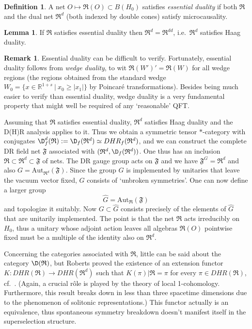 \documentclass[11pt]{article}
\newcommand{\alg}[1]{\mathfrak{#1}}
\theoremstyle{definition}
\newtheorem{lemma}[thm]{Lemma}
\theoremstyle{definition}
\newtheorem{defn}[thm]{Definition}
\newtheorem{note}[thm]{Remark}
\theoremstyle{remark}
\def\7#1{{\mathbb #1}}
\def\al#1{{\mathfrak #1}}
\newcommand{\Aut}{\mathrm{Aut}}
\newcommand{\rarr}{\rightarrow}
\begin{document}
\begin{defn} A net $O\mapsto\alg{R}(O)\subset B(H_0)$ satisfies \emph{essential
    duality} if both $\alg{R}$ and the dual net $\alg{R}^d$ (both indexed by double
  cones) satisfy microcausality.
\end{defn}

\begin{lemma} If $\alg{R}$ satisfies essential duality then $\alg{R}^d=\alg{R}^{dd}$, i.e.\
$\alg{R}^d$ satisfies Haag duality. 
\end{lemma} 

\begin{note} Essential duality can be difficult to verify. Fortunately, essential
  duality follows from \emph{wedge duality}, to wit $\alg{R}(W')'=\alg{R}(W)$ for all
  wedge regions (the regions obtained from the standard wedge $W_0=\{ x\in\7R^{1+s}\
  | \ x_0\ge|x_1| \}$ by Poincar\'e transformations). Besides being much easier to
  verify than essential duality, wedge duality is a very fundamental property that
  might well be required of any `reasonable' QFT.
\end{note}

Assuming that $\alg{R}$ satisfies essential duality,
$\alg{R}^d$ satisfies Haag duality and the D(H)R
analysis applies to it. Thus we obtain a symmetric
tensor $*$-category with conjugates
$\D_f^d(\alg{R}):=\D_f(\alg{R}^d)\simeq
DHR_f(\alg{R}^d)$, and we can construct the complete DR
field net $\al F$ associated with
$(\alg{R}^d,\D_f(\alg{R}^d))$. One thus has an
inclusion $\alg{R}\subset\alg{R}^d\subset\alg{F}$ of
nets. The DR gauge group acts on $\alg{F}$ and we have
$\alg{F}^G=\alg{R}^d$ and also
$G=\Aut_{\alg{R}^d}(\alg{F})$. Since the group $G$ is
implemented by unitaries that leave the vacuum vector
fixed, $G$ consists of `unbroken symmetries'. One can
now define a larger group
\[ \widehat{G}=\Aut_{\alg{R}}(\alg{F}) \] and topologize it suitably.  Now
$G\subset\widehat{G}$ consists precisely of the elements of $\widehat{G}$ that are
unitarily implemented. The point is that the net $\alg{R}$ acts irreducibly on $H_0$,
thus a unitary whose adjoint action leaves all algebras $\alg{R}(O)$ pointwise fixed
must be a multiple of the identity also on $\alg{R}^d$.

Concerning the categories associated with $\alg{R}$, little can be said about the
category $\D(\alg{R})$, but Roberts proved the existence of an extension functor
$K:DHR(\alg{R})\rarr DHR(\alg{R}^d)$ such that $K(\pi)|\alg{R}=\pi$ for every $\pi\in
DHR(\alg{R})$, cf.\ \cite[\S 3.4]{rob-lec}. (Again, a crucial r\^ole is played by the
theory of local 1-cohomology. Furthermore, this result breaks down in less than three
spacetime dimensions due to the phenomenon of solitonic representations.) This
functor actually is an equivalence, thus spontaneous symmetry breakdown doesn't
manifest itself in the superselection structure.
\end{document}
